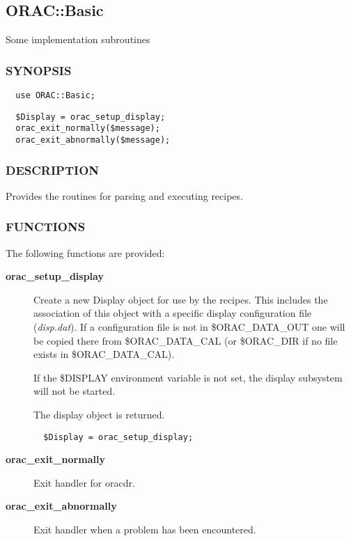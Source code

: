 \subsection{ORAC::Basic\label{ORAC::Basic}}

Some implementation subroutines

\subsubsection*{SYNOPSIS\label{ORAC::Basic_SYNOPSIS}}\begin{verbatim}
  use ORAC::Basic;
\end{verbatim}
\begin{verbatim}
  $Display = orac_setup_display;
  orac_exit_normally($message);
  orac_exit_abnormally($message);
\end{verbatim}
\subsubsection*{DESCRIPTION\label{ORAC::Basic_DESCRIPTION}}

Provides the routines for parsing and executing recipes.

\subsubsection*{FUNCTIONS\label{ORAC::Basic_FUNCTIONS}}

The following functions are provided:

\begin{description}
\item[\textbf{orac\_setup\_display}] \mbox{}

Create a new Display object for use by the recipes. This includes
the association of this object with a specific display configuration
file (\emph{disp.dat}). If a configuration file is not in \$ORAC\_DATA\_OUT
one will be copied there from \$ORAC\_DATA\_CAL (or \$ORAC\_DIR
if no file exists in \$ORAC\_DATA\_CAL).



If the \$DISPLAY environment variable is not set, the display
subsystem will not be started.



The display object is returned.

\begin{verbatim}
  $Display = orac_setup_display;
\end{verbatim}
\item[\textbf{orac\_exit\_normally}] \mbox{}

Exit handler for oracdr.

\item[\textbf{orac\_exit\_abnormally}] \mbox{}

Exit handler when a problem has been encountered.

\end{description}



